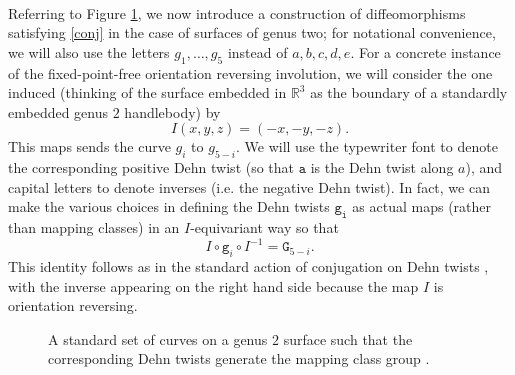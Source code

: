 \documentclass[11pt]{amsart}
\theoremstyle{definition}
\theoremstyle{remark}
\begin{document}
\\
\par
Referring to Figure \ref{genus2}, we now introduce a construction of diffeomorphisms satisfying \ref{conj} in the case of surfaces of genus two; for notational convenience, we will also use the letters $g_1,\dots, g_5$ instead of $a,b,c,d,e$. For a concrete instance of the fixed-point-free orientation reversing involution, we will consider the one induced (thinking of the surface embedded in $\mathbb{R}^3$ as the boundary of a standardly embedded genus $2$ handlebody) by
\begin{equation*}
I(x,y,z)=(-x,-y,-z).
\end{equation*}
This maps sends the curve $g_i$ to $g_{5-i}$. We will use the typewriter font to denote the corresponding positive Dehn twist (so that $\mathtt{a}$ is the Dehn twist along $a$), and capital letters to denote inverses (i.e. the negative Dehn twist). In fact, we can make the various choices in defining the Dehn twists $\mathtt{g_i}$ as actual maps (rather than mapping classes) in an $I$-equivariant way so that
\begin{equation*}
I\circ \mathtt{g}_i\circ I^{-1}=\mathtt{G}_{5-i}. 
\end{equation*}
This identity follows as in the standard action of conjugation on Dehn twists \cite{FM}, with the inverse appearing on the right hand side because the map $I$ is orientation reversing.

\begin{figure}
  \centering
\def\svgwidth{0.8\textwidth}

\caption{A standard set of curves on a genus $2$ surface such that the corresponding Dehn twists generate the mapping class group \cite{FM}.}
\label{genus2}
\end{figure} 
\end{document}
